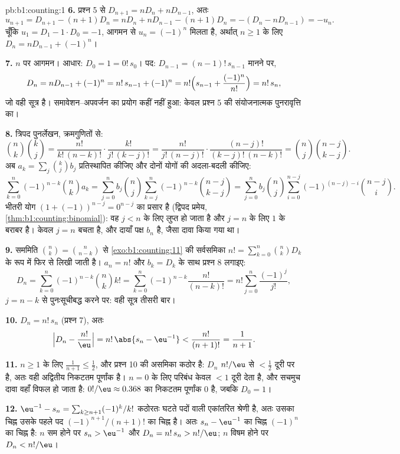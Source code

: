 \begin{solution}{pb:b1:counting:1}
\textbf{6.} प्रश्न 5 से $D_{n+1} = nD_n + nD_{n-1}$, अतः
\[
u_{n+1} = D_{n+1} - (n+1)D_n = nD_n + nD_{n-1} - (n+1)D_n
= -(D_n - nD_{n-1}) = -u_n .
\]
चूँकि $u_1 = D_1 - 1 \cdot D_0 = -1$, आगमन से $u_n = (-1)^n$ मिलता है,
अर्थात् $n \geq 1$ के लिए $D_n = nD_{n-1} + (-1)^n$।

\textbf{7.} $n$ पर आगमन। आधार: $D_0 = 1 = 0!\,s_0$। पद: $D_{n-1} =
(n-1)!\,s_{n-1}$ मानने पर,
\[
D_n = nD_{n-1} + (-1)^n = n!\,s_{n-1} + (-1)^n
= n!\Bigl(s_{n-1} + \frac{(-1)^n}{n!}\Bigr) = n!\,s_n ,
\]
जो वही सूत्र है। समावेशन--अपवर्जन का प्रयोग कहीं नहीं हुआ: केवल प्रश्न 5 की
संयोजनात्मक पुनरावृत्ति का।

\textbf{8.} त्रिपद पुनर्लेखन, क्रमगुणितों से:
\[
\binom nk \binom kj
= \frac{n!}{k!\,(n-k)!} \cdot \frac{k!}{j!\,(k-j)!}
= \frac{n!}{j!\,(n-j)!} \cdot \frac{(n-j)!}{(k-j)!\,(n-k)!}
= \binom nj \binom{n-j}{k-j} .
\]
अब $a_k = \sum_j \binom kj b_j$ प्रतिस्थापित कीजिए और दोनों  योगों की
अदला-बदली कीजिए:
\[
\sum_{k=0}^{n} (-1)^{n-k} \binom nk a_k
= \sum_{j=0}^{n} b_j \binom nj
\sum_{k=j}^{n} (-1)^{n-k} \binom{n-j}{k-j}
= \sum_{j=0}^{n} b_j \binom nj
\sum_{i=0}^{n-j} (-1)^{(n-j)-i} \binom{n-j}{i} .
\]
भीतरी योग $(1 + (-1))^{n-j} = 0^{n-j}$ का प्रसार है (द्विपद प्रमेय,
\cref{thm:b1:counting:binomial}): वह $j < n$ के लिए लुप्त हो जाता है और $j =
n$ के लिए $1$ के बराबर है। केवल $j = n$ बचता है, और दायाँ पक्ष $b_n$ है,
जैसा दावा किया गया था।

\textbf{9.} सममिति $\binom nk = \binom n{n-k}$ से \cref{exo:b1:counting:11}
की सर्वसमिका $n! = \sum_{k=0}^n \binom nk D_k$ के रूप में फिर से लिखी जाती
है। $a_n = n!$ और $b_k = D_k$ के साथ प्रश्न 8 लगाइए:
\[
D_n = \sum_{k=0}^{n} (-1)^{n-k} \binom nk k!
= \sum_{k=0}^{n} (-1)^{n-k} \frac{n!}{(n-k)!}
= n! \sum_{j=0}^{n} \frac{(-1)^j}{j!} ,
\]
$j = n - k$ से पुनःसूचीबद्ध करने पर: वही सूत्र तीसरी बार।

\textbf{10.} $D_n = n!\,s_n$ (प्रश्न 7), अतः
\[
\Bigl| D_n - \frac{n!}{\eu} \Bigr|
= n!\,\abs{s_n - \eu^{-1}} < \frac{n!}{(n+1)!} = \frac1{n+1} .
\]

\textbf{11.} $n \geq 1$ के लिए $\frac1{n+1} \leq \frac12$, और प्रश्न 10 की
असमिका कठोर है: $D_n$ $n!/\eu$ से $< \frac12$ दूरी पर है, अतः वही अद्वितीय
निकटतम पूर्णांक है। $n = 0$ के लिए परिबंध केवल $< 1$ दूरी देता है, और सचमुच
दावा वहाँ विफल हो जाता है: $0!/\eu \approx 0.368$ का निकटतम पूर्णांक $0$ है,
जबकि $D_0 = 1$।

\textbf{12.} $\eu^{-1} - s_n = \sum_{k \geq n+1} (-1)^k/k!$ कठोरतः घटते पदों
वाली एकांतरित श्रेणी है, अतः उसका चिह्न उसके पहले पद $(-1)^{n+1}/(n+1)!$ का
चिह्न है। अतः $s_n - \eu^{-1}$ का चिह्न $(-1)^n$ का चिह्न है: $n$ सम होने पर
$s_n > \eu^{-1}$ और $D_n = n!\,s_n > n!/\eu$; $n$ विषम होने पर $D_n <
n!/\eu$।


\end{solution}
